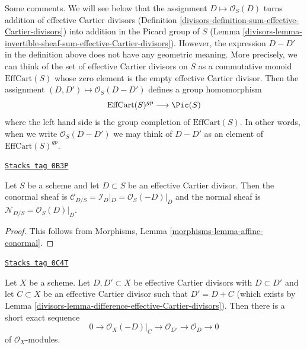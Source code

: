 Some comments. We will see below that the assignment
$D \mapsto \mathcal{O}_S(D)$ turns addition of effective Cartier
divisors (Definition \ref{divisors-definition-sum-effective-Cartier-divisors})
into addition in the Picard group of $S$
(Lemma \ref{divisors-lemma-invertible-sheaf-sum-effective-Cartier-divisors}).
However, the expression $D - D'$ in the definition above does not
have any geometric meaning. More precisely, we can think of the
set of effective Cartier divisors on $S$ as a commutative monoid
$\text{EffCart}(S)$ whose zero element is the empty effective Cartier divisor.
Then the assignment $(D, D') \mapsto \mathcal{O}_S(D - D')$ defines
a group homomorphism
$$
\text{EffCart}(S)^{gp} \longrightarrow \Pic(S)
$$
where the left hand side is the group completion of
$\text{EffCart}(S)$. In other words, when we write $\mathcal{O}_S(D - D')$
we may think of $D - D'$ as an element of $\text{EffCart}(S)^{gp}$.

\begin{lemma}
\label{divisors-lemma-conormal-effective-Cartier-divisor}
\href{https://stacks.math.columbia.edu/tag/0B3P}{\texttt{Stacks tag 0B3P}}

Let $S$ be a scheme and let $D \subset S$ be an effective Cartier divisor.
Then the conormal sheaf is $\mathcal{C}_{D/S} = \mathcal{I}_D|_D =
\mathcal{O}_S(-D)|_D$ and the normal sheaf is
$\mathcal{N}_{D/S} = \mathcal{O}_S(D)|_D$.
\end{lemma}

\begin{proof}
This follows from Morphisms, Lemma \ref{morphisms-lemma-affine-conormal}.
\end{proof}

\begin{lemma}
\label{divisors-lemma-ses-add-divisor}
\href{https://stacks.math.columbia.edu/tag/0C4T}{\texttt{Stacks tag 0C4T}}

Let $X$ be a scheme. Let $D, D' \subset X$ be effective Cartier divisors
with $D \subset D'$ and let $C \subset X$ be an effective Cartier divisor
such that $D' = D + C$ (which exists by
Lemma \ref{divisors-lemma-difference-effective-Cartier-divisors}).
Then there is a short exact sequence
$$
0 \to \mathcal{O}_X(-D)|_C \to \mathcal{O}_{D'} \to \mathcal{O}_D \to 0
$$
of $\mathcal{O}_X$-modules.
\end{lemma}

